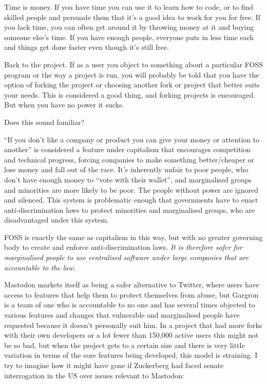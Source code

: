 \documentclass[10pt]{article}
\begin{document}
\begin{multicols}{2}
Time is money. If you have time you can use it to learn how to code, or to find skilled people and persuade them that it’s a good idea to work for you for free. If you lack time, you can often get around it by throwing money at it and buying someone else’s time. If you have enough people, everyone puts in less time each and things get done faster even though it’s still free.

Back to the project. If as a user you object to something about a particular FOSS program or the way a project is run, you will probably be told that you have the option of forking the project or choosing another fork or project that better suits your needs. This is considered a good thing, and forking projects is encouraged. But when you have no power it sucks.

Does this sound familiar?

“If you don’t like a company or product you can give your money or attention to another” is considered a feature under capitalism that encourages competition and technical progress, forcing companies to make something better/cheaper or lose money and fall out of the race. It’s inherently unfair to poor people, who don’t have enough money to “vote with their wallet”, and marginalised groups and minorities are more likely to be poor. The people without power are ignored and silenced. This system is problematic enough that governments have to enact anti-discrimination laws to protect minorities and marginalised groups, who are disadvantaged under this system.

FOSS is exactly the same as capitalism in this way, but with no greater governing body to create and enforce anti-discrimination laws. \emph{It is therefore safer for marginalised people to use centralised software under large companies that are accountable to the law.}

Mastodon markets itself as being a safer alternative to Twitter, where users have access to features that help them to protect themselves from abuse, but Gargron is a team of one who is accountable to no one and has several times objected to various features and changes that vulnerable and marginalised people have requested because it doesn’t personally suit him. In a project that had more forks with their own developers or a lot fewer than 150,000 active users this might not be so bad, but when the project gets to a certain size and there is very little variation in terms of the core features being developed, this model is straining. I try to imagine how it might have gone if Zuckerberg had faced senate interrogation in the US over issues relevant to Mastodon:


\end{multicols}
\end{document}
